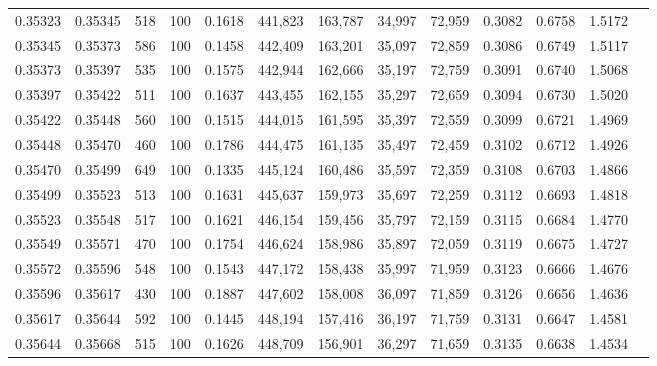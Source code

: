 \begin{tabular}{rrrrrrrrrrrrr}
0.35323 & 0.35345 &    518 & 100 &                                     0.1618 & 441,823 & 163,787 &  34,997 &  72,959 & 0.3082 & 0.6758 & 1.5172 \\
0.35345 & 0.35373 &    586 & 100 &                                     0.1458 & 442,409 & 163,201 &  35,097 &  72,859 & 0.3086 & 0.6749 & 1.5117 \\
0.35373 & 0.35397 &    535 & 100 &                                     0.1575 & 442,944 & 162,666 &  35,197 &  72,759 & 0.3091 & 0.6740 & 1.5068 \\
0.35397 & 0.35422 &    511 & 100 &                                     0.1637 & 443,455 & 162,155 &  35,297 &  72,659 & 0.3094 & 0.6730 & 1.5020 \\
0.35422 & 0.35448 &    560 & 100 &                                     0.1515 & 444,015 & 161,595 &  35,397 &  72,559 & 0.3099 & 0.6721 & 1.4969 \\
0.35448 & 0.35470 &    460 & 100 &                                     0.1786 & 444,475 & 161,135 &  35,497 &  72,459 & 0.3102 & 0.6712 & 1.4926 \\
0.35470 & 0.35499 &    649 & 100 &                                     0.1335 & 445,124 & 160,486 &  35,597 &  72,359 & 0.3108 & 0.6703 & 1.4866 \\
0.35499 & 0.35523 &    513 & 100 &                                     0.1631 & 445,637 & 159,973 &  35,697 &  72,259 & 0.3112 & 0.6693 & 1.4818 \\
0.35523 & 0.35548 &    517 & 100 &                                     0.1621 & 446,154 & 159,456 &  35,797 &  72,159 & 0.3115 & 0.6684 & 1.4770 \\
0.35549 & 0.35571 &    470 & 100 &                                     0.1754 & 446,624 & 158,986 &  35,897 &  72,059 & 0.3119 & 0.6675 & 1.4727 \\
0.35572 & 0.35596 &    548 & 100 &                                     0.1543 & 447,172 & 158,438 &  35,997 &  71,959 & 0.3123 & 0.6666 & 1.4676 \\
0.35596 & 0.35617 &    430 & 100 &                                     0.1887 & 447,602 & 158,008 &  36,097 &  71,859 & 0.3126 & 0.6656 & 1.4636 \\
0.35617 & 0.35644 &    592 & 100 &                                     0.1445 & 448,194 & 157,416 &  36,197 &  71,759 & 0.3131 & 0.6647 & 1.4581 \\
0.35644 & 0.35668 &    515 & 100 &                                     0.1626 & 448,709 & 156,901 &  36,297 &  71,659 & 0.3135 & 0.6638 & 1.4534 \\

\end{tabular}
